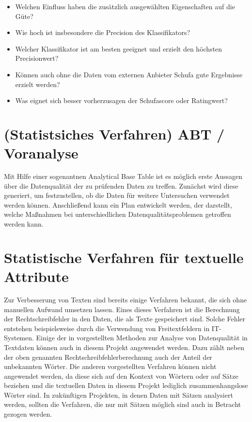 \begin{itemize}
 \item Welchen Einfluss haben die zusätzlich ausgewählten Eigenschaften auf die Güte?
 \item Wie hoch ist insbesondere die Precision des Klassifikators?
 \item Welcher Klassifikator ist am besten geeignet und erzielt den höchsten Precisionwert?
 \item Können auch ohne die Daten vom externen Anbieter Schufa gute Ergebnisse erzielt werden?
 \item Was eignet sich besser vorherzusagen der Schufascore oder Ratingwert?
\end{itemize}



\section{(Statistsiches Verfahren) ABT / Voranalyse}
Mit Hilfe einer sogenantnen Analytical Base Table ist es möglich erste Aussagen über die Datenqualität der zu prüfenden Daten zu treffen.
Zunächst wird diese generiert, um festzustellen, ob die Daten für weitere Untersuchen verwendet werden können.
Anschließend kann ein Plan entwickelt werden, der darstellt, welche Maßnahmen bei unterschiedlichen Datenqualitätsproblemen getroffen werden kann.


\section{Statistische Verfahren für textuelle Attribute}
\label{sec:textVerfahren}
Zur Verbesserung von Texten sind bereits einige Verfahren bekannt, die sich ohne manuellen Aufwand umsetzen lassen.
Eines dieses Verfahren ist die Berechnung der Rechtschreibfehler in den Daten, die als Texte gespeichert sind. 
Solche Fehler entstehen beispielsweise durch die Verwendung von Freitextfeldern in IT-Systemen.  
Einige der in \cite{kiefer2019} vorgestellten Methoden zur Analyse von Datenqualität in Textdaten können auch in diesem Projekt angewendet werden. 
Dazu zählt neben der oben genannten Rechtschreibfehlerberechnung auch der Anteil der unbekannten Wörter. 
Die anderen vorgestellten Verfahren können nicht angewendet werden, da diese sich auf den Kontext von Wörtern oder auf Sätze beziehen und die textuellen Daten in diesem Projekt lediglich zusammenhangslose Wörter sind.
In zukünftigen Projekten, in denen Daten mit Sätzen analysiert werden, sollten die Verfahren, die nur mit Sätzen möglich sind auch in Betracht gezogen werden. \\

